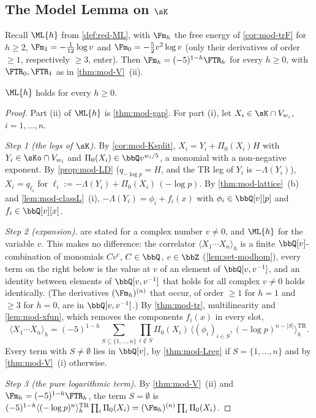 \subsection{The Model Lemma on \texorpdfstring{$\sK$}{K}}
\label{sec:mod-MLK}

Recall $\ML{h}$ from \cref{def:red-ML}, with $\Fm_h$ the free energy of \cref{cor:mod-trF} for $h\geq 2$, $\Fm_1=-\frac1{12}\log v$ and $\Fm_0=-\frac52v^2\log v$ (only their derivatives of order $\geq 1$, respectively $\geq 3$, enter). Then $\Fm_h=(-5)^{1-h}\FTR_h$ for every $h\geq 0$, with $\FTR_0,\FTR_1$ as in \cref{thm:mod-V}~(ii).

\begin{thm}
\label{thm:mod-MLK}
$\ML{h}$ holds for every $h\geq 0$.
\end{thm}

\begin{proof}
Part (ii) of $\ML{h}$ is \cref{thm:mod-gap}. For part (i), let $X_i\in\sK\cap V_{w_i}$, $i=1,\dots,n$.

\emph{Step 1 (the legs of $\sK$).} By \cref{cor:mod-Ksplit}, $X_i=Y_i+\Pi_0(X_i)H$ with $Y_i\in\sKo\cap V_{w_i}$ and $\Pi_0(X_i)\in\bbQ v^{w_i/5}$, a monomial with a non-negative exponent. By \cref{prop:mod-LD} ($q_{-\log p}=H$, and the TR leg of $Y_i$ is $-\Lambda(Y_i)$), $X_i=q_{\ell_i}$ for $\ell_i:=-\Lambda(Y_i)+\Pi_0(X_i)\,(-\log p)$. By \cref{thm:mod-lattice}~(b) and \cref{lem:mod-classL}~(i), $-\Lambda(Y_i)=\phi_i+f_i(x)$ with $\phi_i\in\bbQ[v][p]$ and $f_i\in\bbQ[v][x]$.

\emph{Step 2 (expansion).}  are stated for a complex number $v\neq0$, and $\ML{h}$ for the variable $v$. This makes no difference: the correlator $\langle X_1\cdots X_n\rangle_h$ is a finite $\bbQ[v]$-combination of monomials $Cv^e$, $C\in\bbQ$, $e\in\bbZ$ (\cref{lem:set-modhom}), every term on the right below is the value at $v$ of an element of $\bbQ[v,v^{-1}]$, and an identity between elements of $\bbQ[v,v^{-1}]$ that holds for all complex $v\neq0$ holds identically. (The derivatives $(\Fm_h)^{(n)}$ that occur, of order $\geq1$ for $h=1$ and $\geq3$ for $h=0$, are in $\bbQ[v,v^{-1}]$.) By \cref{thm:mod-tr}, multilinearity and \cref{lem:mod-xfun}, which removes the components $f_i(x)$ in every slot,
\[
\langle X_1\cdots X_n\rangle_h=(-5)^{1-h}\sum_{S\subseteq\{1,\dots,n\}}\prod_{i\notin S}\Pi_0(X_i)\,\big\langle(\phi_i)_{i\in S},(-\log p)^{n-|S|}\big\rangle^{\mathrm{TR}}_h .
\]
Every term with $S\neq\emptyset$ lies in $\bbQ[v]$, by \cref{thm:mod-Lreg} if $S=\{1,\dots,n\}$ and by \cref{thm:mod-V}~(i) otherwise.

\emph{Step 3 (the pure logarithmic term).} By \cref{thm:mod-V}~(ii) and $\Fm_h=(-5)^{1-h}\FTR_h$, the term $S=\emptyset$ is $(-5)^{1-h}\langle(-\log p)^n\rangle^{\mathrm{TR}}_h\prod_i\Pi_0(X_i)=(\Fm_h)^{(n)}\prod_i\Pi_0(X_i)$.
\end{proof}

